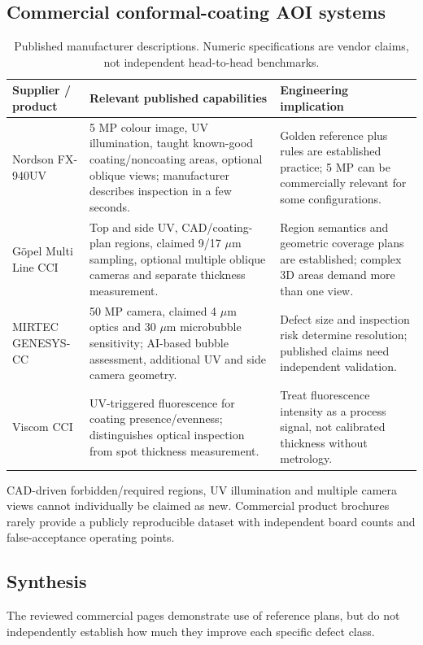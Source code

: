 \subsection{Commercial conformal-coating AOI systems}
\begin{table}[htbp]\centering\footnotesize
\caption{Published manufacturer descriptions. Numeric specifications are vendor claims, not independent head-to-head benchmarks.}
\begin{tabularx}{\textwidth}{p{23mm}X X}\toprule
Supplier / product & Relevant published capabilities & Engineering implication \\\midrule
Nordson FX-940UV \citep{nordsoncci} & 5 MP colour image, UV illumination, taught known-good coating/noncoating areas, optional oblique views; manufacturer describes inspection in a few seconds. & Golden reference plus rules are established practice; 5 MP can be commercially relevant for some configurations.\\
G\"opel Multi Line CCI \citep{goepelcci} & Top and side UV, CAD/coating-plan regions, claimed 9/17 $\mu$m sampling, optional multiple oblique cameras and separate thickness measurement. & Region semantics and geometric coverage plans are established; complex 3D areas demand more than one view.\\
MIRTEC GENESYS-CC \citep{mirteccci} & 50 MP camera, claimed 4 $\mu$m optics and 30 $\mu$m microbubble sensitivity; AI-based bubble assessment, additional UV and side camera geometry. & Defect size and inspection risk determine resolution; published claims need independent validation.\\
Viscom CCI \citep{viscomcci} & UV-triggered fluorescence for coating presence/evenness; distinguishes optical inspection from spot thickness measurement. & Treat fluorescence intensity as a process signal, not calibrated thickness without metrology.\\
\bottomrule\end{tabularx}
\label{tab:commercial}
\end{table}

CAD-driven forbidden/required regions, UV illumination and multiple camera views cannot individually be claimed as new. Commercial product brochures rarely provide a publicly reproducible dataset with independent board counts and false-acceptance operating points.

\subsection{Synthesis}
The reviewed commercial pages demonstrate use of reference plans, but do not independently establish how much they improve each specific defect class.
